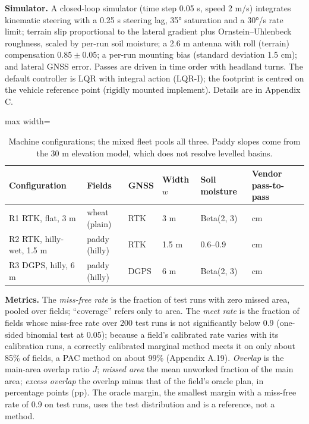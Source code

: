 \documentclass[preprint,12pt,authoryear]{elsarticle}
\begin{document}
\textbf{Simulator.} A closed-loop simulator (time step 0.05 s, speed 2 m/s) integrates kinematic steering with a 0.25 s steering lag, 35° saturation and a 30°/s rate limit; terrain slip proportional to the lateral gradient plus Ornstein--Uhlenbeck roughness, scaled by per-run soil moisture; a 2.6 m antenna with roll (terrain) compensation \(0.85\pm0.05\); a per-run mounting bias (standard deviation 1.5 cm); and lateral GNSS error. Passes are driven in time order with headland turns. The default controller is LQR with integral action (LQR-I); the footprint is centred on the vehicle reference point (rigidly mounted implement). Details are in Appendix C.

\begin{table}[!htbp]
\centering
\footnotesize
\caption{Machine configurations; the mixed fleet pools all three. Paddy slopes come from the 30 m elevation model, which does not resolve levelled basins.}\label{tab:4}
\begin{adjustbox}{max width=\textwidth}
\begin{tabular}{@{}lllll>{\raggedright\arraybackslash}p{7.3em}@{}}
\toprule
\textbf{Configuration} & \textbf{Fields} & \textbf{GNSS} & \textbf{Width \(w\)} & \textbf{Soil moisture} & \textbf{Vendor pass-to-pass} \\
\midrule
R1 RTK, flat, 3 m & wheat (plain) & RTK & 3 m & Beta(2, 3) & 2.5 cm \\
R2 RTK, hilly-wet, 1.5 m & paddy (hilly) & RTK & 1.5 m & 0.6--0.9 & 2.5 cm \\
R3 DGPS, hilly, 6 m & paddy (hilly) & DGPS & 6 m & Beta(2, 3) & 20 cm \\
\bottomrule
\end{tabular}
\end{adjustbox}
\end{table}

\textbf{Metrics.} The \emph{miss-free rate} is the fraction of test runs with zero missed area, pooled over fields; ``coverage'' refers only to area. The \emph{meet rate} is the fraction of fields whose miss-free rate over 200 test runs is not significantly below 0.9 (one-sided binomial test at 0.05); because a field's calibrated rate varies with its calibration runs, a correctly calibrated marginal method meets it on only about 85\% of fields, a PAC method on about 99\% (Appendix A.19). \emph{Overlap} is the main-area overlap ratio \(J\); \emph{missed area} the mean unworked fraction of the main area; \emph{excess overlap} the overlap minus that of the field's oracle plan, in percentage points (pp). The oracle margin, the smallest margin with a miss-free rate of 0.9 on test runs, uses the test distribution and is a reference, not a method.
\end{document}
